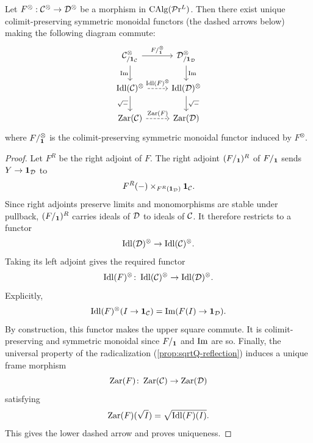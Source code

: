 \documentclass[10pt,a4paper,oneside]{article}
\begin{document}
\begin{prop}\label{functorial}
Let $F^\otimes: \mathcal{C}^\otimes\to\mathcal{D}^\otimes$ be a morphism in $\operatorname{CAlg}(\mathcal{P}\mathrm{r}^L)$. Then there exist unique  colimit-preserving symmetric monoidal functors (the dashed arrows below) making the following diagram commute:
$$%
\begin{tikzcd}
\mcc_{/\mb{1}_\mcc}^\otimes \arrow[r, "F/_{\mb1}^\otimes"] \arrow[d, "\im"']                                 & \mcd_{/\mb{1}_\mcd}^\otimes \arrow[d, "\im"] \\
\idl(\mc{C})^\otimes \arrow[r, "\idl(F)^\otimes", dashed] \arrow[d, "\sqrt{-}"']             & \idl(\mc{D})^\otimes \arrow[d, "\sqrt{-}"]        \\
\zar(\mcc) \arrow[r, "\zar(F)", dashed] & \zar(\mcd)
\end{tikzcd}$$
where $F/_{\mathbf1}^\otimes$ is the colimit-preserving symmetric monoidal functor induced by $F^\otimes$.
\end{prop}
\begin{proof}
Let $F^R$ be the right adjoint of $F$. The right adjoint $(F/_{\mathbf1})^R$ of $F/_{\mathbf1}$ sends $Y\to\mathbf1_{\mathcal{D}}$ to
\[
F^R(-)\times_{F^R(\mathbf{1}_\mathcal{D})}\mathbf{1}_\mathcal{C}.
\]
Since right adjoints preserve limits and monomorphisms are stable under pullback, $(F/_{\mathbf1})^R$ carries ideals of $\mathcal{D}$ to ideals of $\mathcal{C}$. It therefore restricts to a functor
\[
\operatorname{Idl}(\mathcal{D})^\otimes \to \operatorname{Idl}(\mathcal{C})^\otimes.
\]
Taking its left adjoint gives the required functor
\[
\operatorname{Idl}(F)^\otimes\colon \operatorname{Idl}(\mathcal{C})^\otimes \to \operatorname{Idl}(\mathcal{D})^\otimes.
\]
Explicitly,
\[
\operatorname{Idl}(F)^\otimes(I\to\mathbf1_{\mathcal{C}}) = \operatorname{Im}(F(I)\to\mathbf1_{\mathcal{D}}).
\]
By construction, this functor makes the upper square commute. It is colimit-preserving and symmetric monoidal since $F/_{\mathbf1}$ and $\operatorname{Im}$ are so. Finally, the universal property of the radicalization (\cref{prop:sqrtQ-reflection}) induces a unique frame morphism
\[
\operatorname{Zar}(F) \colon \operatorname{Zar}(\mathcal{C}) \to \operatorname{Zar}(\mathcal{D})
\]
satisfying
\[
\operatorname{Zar}(F)(\sqrt{I})=\sqrt{\operatorname{Idl}(F)(I)}.
\]
This gives the lower dashed arrow and proves uniqueness.
\end{proof}
\end{document}
